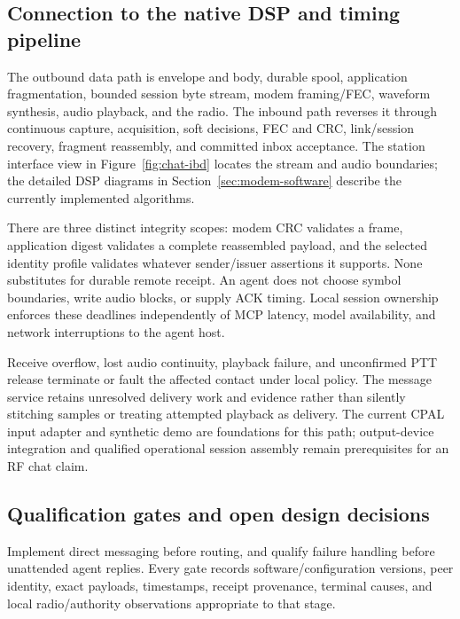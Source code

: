 
\subsection{Connection to the native DSP and timing pipeline}
The outbound data path is envelope and body, durable spool, application
fragmentation, bounded session byte stream, modem framing/FEC, waveform
synthesis, audio playback, and the radio. The inbound path reverses it through
continuous capture, acquisition, soft decisions, FEC and CRC, link/session
recovery, fragment reassembly, and committed inbox acceptance. The station
interface view in Figure~\ref{fig:chat-ibd} locates the stream and audio
boundaries; the detailed DSP diagrams in Section~\ref{sec:modem-software}
describe the currently implemented algorithms.

There are three distinct integrity scopes: modem CRC validates a frame,
application digest validates a complete reassembled payload, and the selected
identity profile validates whatever sender/issuer assertions it supports.
None substitutes for durable remote receipt. An agent does not choose
symbol boundaries, write audio blocks, or supply ACK timing. Local session
ownership enforces these deadlines independently of MCP latency, model
availability, and network interruptions to the agent host.

Receive overflow, lost audio continuity, playback failure, and unconfirmed
PTT release terminate or fault the affected contact under local policy. The
message service retains unresolved delivery work and evidence rather than
silently stitching samples or treating attempted playback as delivery. The
current CPAL input adapter and synthetic demo are foundations for this path;
output-device integration and qualified operational session assembly remain
prerequisites for an RF chat claim.

\subsection{Qualification gates and open design decisions}
\label{sec:chat-qualification}
Implement direct messaging before routing, and qualify failure handling before
unattended agent replies. Every gate records software/configuration versions,
peer identity, exact payloads, timestamps, receipt provenance, terminal causes,
and local radio/authority observations appropriate to that stage.


